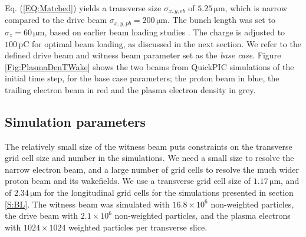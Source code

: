 \documentclass[aps,prstab,reprint,amsmath,amssymb,groupedaddress]{revtex4-1}
\newcommand{\unit}[1]{\,\mathrm{#1}}
\newcommand{\nexp}[1]{\times 10^{#1}}
\begin{document}
Eq. (\ref{EQ:Matched}) yields a transverse size $\sigma_{x,y,eb}$ of $5.25\unit{\mu m}$, which is narrow compared to the
drive beam $\sigma_{x,y,pb} = 200\unit{\mu m}$. The bunch length was set to $\sigma_{z} = 60\unit{\mu m}$, based on
earlier beam loading studies \cite{berglyd_olsen:2016}. The charge is adjusted to $100\unit{pC}$ for optimal beam
loading, as discussed in the next section. We refer to the defined drive beam and witness beam parameter set as the
\emph{base case}. Figure \ref{Fig:PlasmaDenTWake} shows the two beams from QuickPIC simulations of the initial time
step, for the base case parameters; the proton beam in blue, the trailing electron beam in red and the plasma electron
density in grey. 



\subsection{Simulation parameters}\label{SIM}

The relatively small size of the witness beam puts constraints on the transverse grid cell size and number in the
simulations. We need a small size to resolve the narrow electron beam, and a large number of grid cells to resolve the
much wider proton beam and its wakefields. We use a transverse grid cell size of $1.17\unit{\mu m}$, and of
$2.34\unit{\mu m}$ for the longitudinal grid cells for the simulations presented in section \ref{S:BL}. The witness beam
was simulated with $16.8\nexp{6}$ non-weighted particles, the drive beam with $2.1\nexp{6}$ non-weighted particles, and
the plasma electrons with $1024 \times 1024$ weighted particles per transverse slice.
\end{document}
